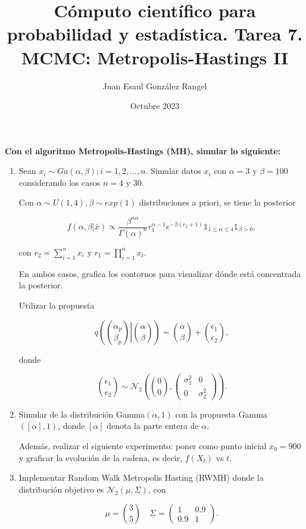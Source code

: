 \documentclass{article}
\title{Cómputo científico para probabilidad y estadística. Tarea 7.\\
MCMC: Metropolis-Hastings II}
\author{Juan Esaul González Rangel}
\date{Octubre 2023}
\begin{document}
\maketitle

\textbf{ \large Con el algoritmo Metropolis-Hastings (MH), simular lo siguiente: }

\begin{enumerate}

    \item Sean $x_i \sim Ga(\alpha, \beta); i = 1, 2, . . . , n$. Simular datos $x_i$ con $\alpha = 3$ y $\beta = 100$ considerando los casos $n = 4$ y 30.
    
    Con $\alpha \sim U(1,4), \beta \sim exp(1)$ distribuciones a priori, se tiene la posterior

    \[ f(\alpha, \beta | \bar x) \propto \frac{\beta^{n\alpha}}{\Gamma(\alpha)^n} r_1^{\alpha - 1} e^{-\beta(r_2 + 1)} \mathds 1_{1 \le \alpha \le 4} \mathds 1_{\beta > 0}, \]

    con $r_2 = \sum_{i=1}^n x_i$ y $r_1 = \prod_{i=1}^n x_i$.

    En ambos casos, grafica los contornos para visualizar dónde está concentrada la posterior.
    
    Utilizar la propuesta

    \[ q \left( \binom{\alpha_p}{\beta_p} \left| \binom{\alpha}\beta \right. \right) = \binom{\alpha}{\beta} + \binom{\epsilon_1}{\epsilon_2}, \]

    donde

    \[ \binom{\epsilon_1}{\epsilon_2} \sim \mathcal N_2\left( \binom 00, \begin{pmatrix}
        \sigma_1^2 & 0 \\
        0 & \sigma_2^2
    \end{pmatrix} \right). \]


    \item Simular de la distribución Gamma$(\alpha,1)$ con la propuesta Gamma$([\alpha],1)$, donde $[\alpha]$ denota la parte entera de $\alpha$. 
    
    Además, realizar el siguiente experimento: poner como punto inicial $x_0 = 900$ y graficar la evolución de la cadena, es decir, $f (X_t)$ vs $t$.

    \item Implementar Random Walk Metropolis Hasting (RWMH) donde la distribución objetivo es $\mathcal N_2(\mu, \Sigma)$, con

    \[ \mu = \binom{3}{5} \quad \Sigma = \begin{pmatrix}
        1 & 0.9 \\
        0.9 & 1
    \end{pmatrix}. \]



\end{enumerate}
\end{document}
